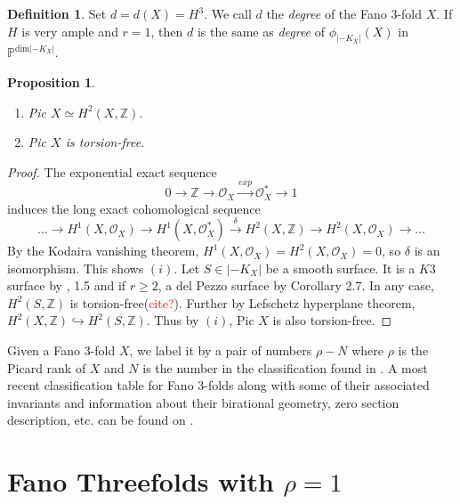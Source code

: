 \documentclass[11pt]{amsart}
\theoremstyle{plain}
\newtheorem{proposition}[theorem]{Proposition}
\theoremstyle{definition}
\newtheorem{definition}[theorem]{Definition}
\theoremstyle{expl}
\begin{document}
\begin{definition}
    Set $d = d(X) =H^3$. We call $d$ the \textit{degree} of the Fano $3$-fold $X$. If $H$ is very ample and $r=1$, then $d$ is the same as \textit{degree} of $\phi_{|-K_X|}(X)$ in $\mathbb{P}^{\text{dim}|-K_X|}$.
\end{definition}
\begin{proposition}
\label{pic}
	\begin{enumerate}
		\item[(i)] Pic $X \simeq H^2(X,\mathbb{Z})$.
		\item[(ii)] Pic $X$ is torsion-free. 
	\end{enumerate}
\end{proposition}
\begin{proof}
	The exponential exact sequence 
	\[
	0 \rightarrow \mathbb{Z} \rightarrow \mathcal{O}_X  \xrightarrow{exp} \mathcal{O}_X^* \rightarrow 1
	\]
	 induces the long exact cohomological sequence 
	 \[
	 \dots \rightarrow H^1(X,\mathcal{O}_X) \rightarrow H^1(X,\mathcal{O}_X^*) \xrightarrow{\delta} H^2(X,\mathbb{Z}) \rightarrow H^2(X,\mathcal{O}_X)\rightarrow \dots 
	 \]
	 By the Kodaira vanishing theorem, $H^1(X,\mathcal{O}_X) = H^2(X,\mathcal{O}_X) =0$, so $\delta$ is an isomorphism. This shows $(i)$. Let $S \in |-K_X|$ be a smooth surface. It is a $K3$ surface by \cite{Isk77}, 1.5 and if $r \geq 2$, a del Pezzo surface by Corollary 2.7. In any case, $H^2(S,\mathbb{Z})$ is torsion-free(\textcolor{red}{cite?}). Further by Lefschetz hyperplane theorem, $H^2(X,\mathbb{Z}) \hookrightarrow H^2(S,\mathbb{Z})$. Thus by $(i)$, Pic $X$ is also torsion-free.
\end{proof}
 
Given a Fano $3$-fold $X$, we label it by a pair of numbers $\rho-N$ where $\rho$ is the Picard rank of $X$ and $N$ is the number in the classification found in \cite{FanoV}. A most recent classification table for Fano $3$-folds along with some of their associated invariants and information about their birational geometry, zero section description, etc. can be found on \cite{Fano}.

	  
\section{Fano Threefolds with $\rho =1$}
\end{document}
